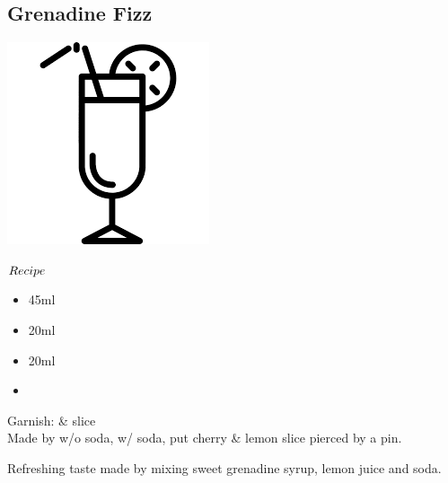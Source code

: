 \subsection{Grenadine Fizz}
\vspace{-7mm}
\hspace{45mm}
\includegraphics[scale=.07]{cocktail_glass_tall.png}
\vspace{2.5mm}
\begin{itembox}[l]{\boldmath $Recipe$}
\begin{itemize}
\setlength{\parskip}{0cm}
\setlength{\itemsep}{0cm}
\item \gin 45ml
\item \lj 20ml
\item \gs 20ml
\item \soda
\end{itemize}
\vspace{-4mm}
Garnish: \cherry \& \lemon slice\\
Made by \shake w/o soda, \build w/ soda, put cherry \& lemon slice pierced by a pin.
\end{itembox}
Refreshing taste made by mixing sweet grenadine syrup, lemon juice and soda.
